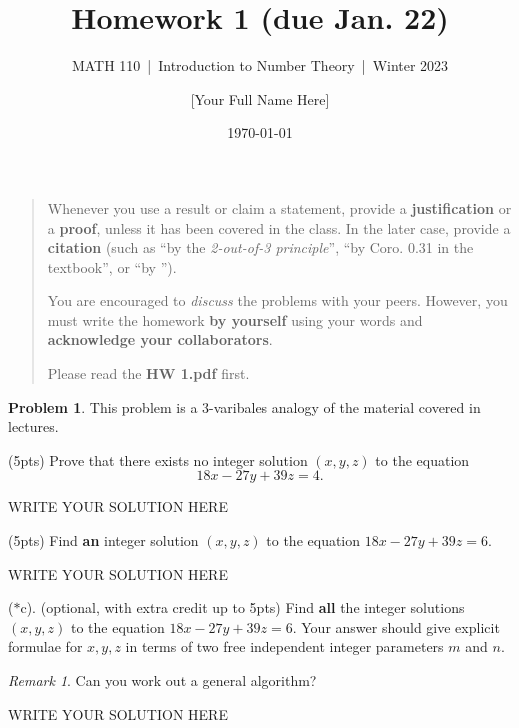 \documentclass[11pt]{article}
\title{Homework 1 (due Jan. 22)}
\author{[Your Full Name Here]}
\subtitle{MATH 110~|~Introduction to Number Theory~|~Winter 2023}
\date{\today}
\theoremstyle{plain}
\theoremstyle{definition}
\newtheorem{problem}{Problem}
\theoremstyle{remark}
\newtheorem*{remark}{Remark}
\numberwithin{equation}{problem}
\begin{document}
\maketitle

\begin{quotation}
	Whenever you use a result or claim a statement, provide a \textbf{justification} or a \textbf{proof}, unless it has been covered in the class. In the later case, provide a \textbf{citation} (such as ``by the \emph{2-out-of-3 principle}'', ``by Coro. 0.31 in the textbook'', or ``by \cite[Coro. 0.31]{texbook}'').

	You are encouraged to \emph{discuss} the problems with your peers. However, you must write the homework \textbf{by yourself} using your words and \textbf{acknowledge your collaborators}.
	
	\Large Please read the \textbf{HW 1.pdf} first. 
\end{quotation}


\begin{problem}\label{p1}
	This problem is a $3$-varibales analogy of the material covered in lectures.
	\begin{listinprob}
		\item\label{1.a} (5pts) Prove that there exists no integer solution $(x, y, z)$ to the equation 
		\[
			18x - 27y + 39z = 4.
		\]

\begin{solution} %
WRITE YOUR SOLUTION HERE
\end{solution}\clearpage %

		\item\label{1.b} (5pts) Find \textbf{an} integer solution $(x, y, z)$ to the equation $18x - 27y + 39z = 6$. 

\begin{solution} %
WRITE YOUR SOLUTION HERE
\end{solution}\clearpage %

		\item[($\ast$c).]\label{1.c} (optional, with extra credit up to 5pts) Find \textbf{all} the integer solutions $(x, y, z)$ to the equation $18x - 27y + 39z = 6$. 
		Your answer should give explicit formulae for $x, y, z$ in terms of two free independent integer parameters $m$ and $n$.
	\end{listinprob}
	\begin{remark}
		Can you work out a general algorithm?
	\end{remark}
\end{problem}
\begin{solution} %
WRITE YOUR SOLUTION HERE
\end{solution}\clearpage %
\end{document}
